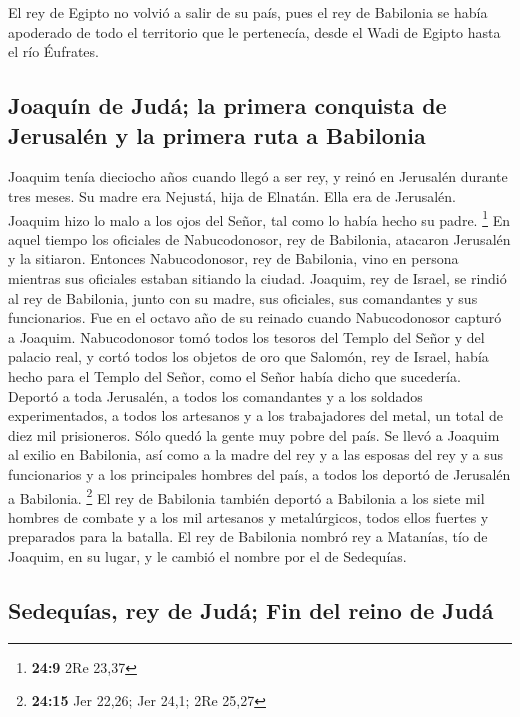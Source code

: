  El rey de Egipto no volvió a salir de su país, pues el
rey de Babilonia se había apoderado de todo el territorio que le
pertenecía, desde el Wadi de Egipto hasta el río Éufrates.

\hypertarget{joaquuxedn-de-juduxe1-la-primera-conquista-de-jerusaluxe9n-y-la-primera-ruta-a-babilonia}{%
\subsection{Joaquín de Judá; la primera conquista de Jerusalén y la
primera ruta a
Babilonia}\label{joaquuxedn-de-juduxe1-la-primera-conquista-de-jerusaluxe9n-y-la-primera-ruta-a-babilonia}}

 Joaquim tenía dieciocho años cuando llegó a ser rey, y
reinó en Jerusalén durante tres meses. Su madre era Nejustá, hija de
Elnatán. Ella era de Jerusalén.  Joaquim hizo lo malo a
los ojos del Señor, tal como lo había hecho su padre. \footnote{\textbf{24:9}
  2Re 23,37}  En aquel tiempo los oficiales de
Nabucodonosor, rey de Babilonia, atacaron Jerusalén y la sitiaron.
 Entonces Nabucodonosor, rey de Babilonia, vino en
persona mientras sus oficiales estaban sitiando la ciudad.
 Joaquim, rey de Israel, se rindió al rey de Babilonia,
junto con su madre, sus oficiales, sus comandantes y sus funcionarios.
Fue en el octavo año de su reinado cuando Nabucodonosor capturó a
Joaquim.  Nabucodonosor tomó todos los tesoros del Templo
del Señor y del palacio real, y cortó todos los objetos de oro que
Salomón, rey de Israel, había hecho para el Templo del Señor, como el
Señor había dicho que sucedería.  Deportó a toda
Jerusalén, a todos los comandantes y a los soldados experimentados, a
todos los artesanos y a los trabajadores del metal, un total de diez mil
prisioneros. Sólo quedó la gente muy pobre del país.  Se
llevó a Joaquim al exilio en Babilonia, así como a la madre del rey y a
las esposas del rey y a sus funcionarios y a los principales hombres del
país, a todos los deportó de Jerusalén a Babilonia. \footnote{\textbf{24:15}
  Jer 22,26; Jer 24,1; 2Re 25,27}  El rey de Babilonia
también deportó a Babilonia a los siete mil hombres de combate y a los
mil artesanos y metalúrgicos, todos ellos fuertes y preparados para la
batalla.  El rey de Babilonia nombró rey a Matanías, tío
de Joaquim, en su lugar, y le cambió el nombre por el de Sedequías.

\hypertarget{sedequuxedas-rey-de-juduxe1-fin-del-reino-de-juduxe1}{%
\subsection{Sedequías, rey de Judá; Fin del reino de
Judá}\label{sedequuxedas-rey-de-juduxe1-fin-del-reino-de-juduxe1}}


